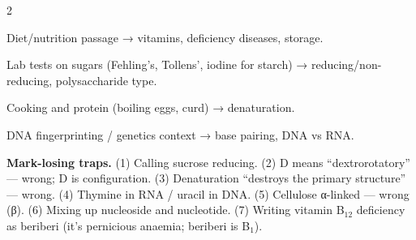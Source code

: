 \documentclass[10pt,a4paper]{extarticle}
\begin{document}
\begin{multicols}{2}
\begin{fl}
\item Diet/nutrition passage → vitamins, deficiency diseases, storage.
\item Lab tests on sugars (Fehling's, Tollens', iodine for starch) → reducing/non-reducing, polysaccharide type.
\item Cooking and protein (boiling eggs, curd) → denaturation.
\item DNA fingerprinting / genetics context → base pairing, DNA vs RNA.
\end{fl}

\begin{tip}\Tip \textbf{Mark-losing traps.} (1) Calling sucrose reducing. (2) D means ``dextrorotatory'' — wrong; D is configuration. (3) Denaturation ``destroys the primary structure'' — wrong. (4) Thymine in RNA / uracil in DNA. (5) Cellulose α-linked — wrong (β). (6) Mixing up nucleoside and nucleotide. (7) Writing vitamin B$_{12}$ deficiency as beriberi (it's pernicious anaemia; beriberi is B$_1$).\end{tip}
\end{multicols}
\begin{tcolorbox}[enhanced,colback=white,colframe=uc,boxrule=0.6pt,arc=2pt,title={\sffamily\bfseries\footnotesize My notes — Ch 10},colbacktitle=uc,coltitle=white,height fill,before skip=4pt]
\end{tcolorbox}
\end{document}
